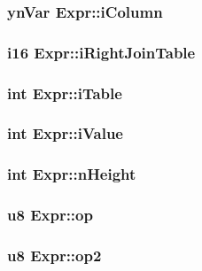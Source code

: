 \subsubsection{\setlength{\rightskip}{0pt plus 5cm}\bf{yn\-Var} \bf{Expr::i\-Column}}\label{structExpr_f8fe1fd9a22cd67c7bd2f731622f0132}


\subsubsection{\setlength{\rightskip}{0pt plus 5cm}\bf{i16} \bf{Expr::i\-Right\-Join\-Table}}\label{structExpr_0c86352042d4a241f6c793eebc730ca9}


\subsubsection{\setlength{\rightskip}{0pt plus 5cm}int \bf{Expr::i\-Table}}\label{structExpr_e9596002e67d80bdd0bd4aa79df5c32a}


\subsubsection{\setlength{\rightskip}{0pt plus 5cm}int \bf{Expr::i\-Value}}\label{structExpr_eec07a98ba946a7a3341dc275bed65c1}


\subsubsection{\setlength{\rightskip}{0pt plus 5cm}int \bf{Expr::n\-Height}}\label{structExpr_ac7d9249b5f4aaa726f4b572b2a673f2}


\subsubsection{\setlength{\rightskip}{0pt plus 5cm}\bf{u8} \bf{Expr::op}}\label{structExpr_5645da8dccf681a446a6ff4f0b74b729}


\subsubsection{\setlength{\rightskip}{0pt plus 5cm}\bf{u8} \bf{Expr::op2}}\label{structExpr_eb2b297c4de370de4a3c301e3777f915}


